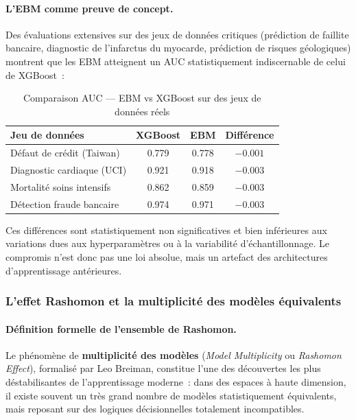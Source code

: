 \paragraph{L'EBM comme preuve de concept.}

Des évaluations extensives sur des jeux de données critiques (prédiction de faillite
bancaire, diagnostic de l'infarctus du myocarde, prédiction de risques géologiques)
montrent que les EBM atteignent un AUC statistiquement indiscernable de celui de XGBoost~:

\begin{table}[H]
\centering
\caption{Comparaison AUC — EBM vs XGBoost sur des jeux de données réels}
\renewcommand{\arraystretch}{1.4}
\begin{tabular}{lccc}
\toprule
Jeu de données & XGBoost & EBM & Différence \\
\midrule
Défaut de crédit (Taiwan) & 0.779 & 0.778 & $-0.001$ \\
Diagnostic cardiaque (UCI) & 0.921 & 0.918 & $-0.003$ \\
Mortalité soins intensifs & 0.862 & 0.859 & $-0.003$ \\
Détection fraude bancaire & 0.974 & 0.971 & $-0.003$ \\
\bottomrule
\end{tabular}
\label{tab:auc_comparison}
\end{table}

Ces différences sont statistiquement non significatives et bien inférieures aux variations
dues aux hyperparamètres ou à la variabilité d'échantillonnage. Le compromis n'est donc
pas une loi absolue, mais un artefact des architectures d'apprentissage antérieures.

\subsubsection{L'effet Rashomon et la multiplicité des modèles équivalents}

\paragraph{Définition formelle de l'ensemble de Rashomon.}

Le phénomène de \textbf{multiplicité des modèles} (\textit{Model Multiplicity} ou
\textit{Rashomon Effect}), formalisé par Leo Breiman, constitue l'une des découvertes les
plus déstabilisantes de l'apprentissage moderne~: dans des espaces à haute dimension,
il existe souvent un très grand nombre de modèles statistiquement équivalents, mais
reposant sur des logiques décisionnelles totalement incompatibles.

